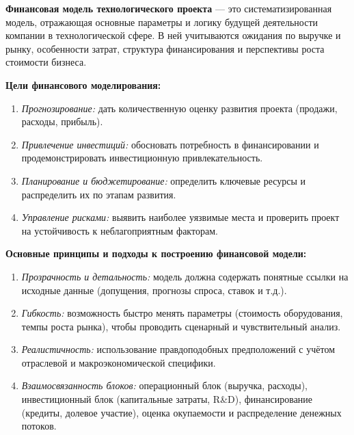\textbf{Финансовая модель технологического проекта} --- это систематизированная модель, отражающая основные параметры и логику будущей деятельности компании в технологической сфере. В ней учитываются ожидания по выручке и рынку, особенности затрат, структура финансирования и перспективы роста стоимости бизнеса.

\textbf{Цели финансового моделирования:}
\begin{enumerate}
    \item \textit{Прогнозирование:} дать количественную оценку развития проекта (продажи, расходы, прибыль).
    \item \textit{Привлечение инвестиций:} обосновать потребность в финансировании и продемонстрировать инвестиционную привлекательность.
    \item \textit{Планирование и бюджетирование:} определить ключевые ресурсы и распределить их по этапам развития.
    \item \textit{Управление рисками:} выявить наиболее уязвимые места и проверить проект на устойчивость к неблагоприятным факторам.
\end{enumerate}

\textbf{Основные принципы и подходы к построению финансовой модели:}
\begin{enumerate}
    \item \textit{Прозрачность и детальность:} модель должна содержать понятные ссылки на исходные данные (допущения, прогнозы спроса, ставок и т.д.).
    \item \textit{Гибкость:} возможность быстро менять параметры (стоимость оборудования, темпы роста рынка), чтобы проводить сценарный и чувствительный анализ.
    \item \textit{Реалистичность:} использование правдоподобных предположений с учётом отраслевой и макроэкономической специфики.
    \item \textit{Взаимосвязанность блоков:} операционный блок (выручка, расходы), инвестиционный блок (капитальные затраты, R\&D), финансирование (кредиты, долевое участие), оценка окупаемости и распределение денежных потоков.
\end{enumerate}

